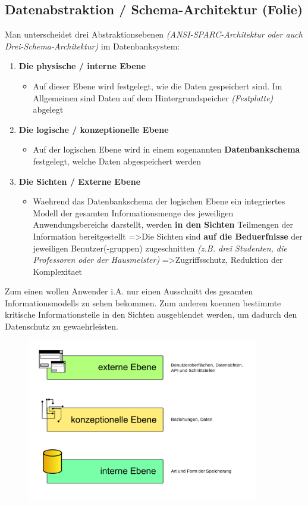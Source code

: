 \documentclass[a4paper,10pt]{article}
\begin{document}
\subsection{Datenabstraktion / Schema-Architektur (Folie)}
Man unterscheidet drei Abstraktionsebenen \emph{(ANSI-SPARC-Architektur oder auch Drei-Schema-Architektur)} im Datenbanksystem:
\begin{enumerate}
\item \textbf{Die physische / interne Ebene}
\begin{itemize}
\item Auf dieser Ebene wird festgelegt, wie die Daten gespeichert sind. Im Allgemeinen sind Daten auf dem Hintergrundspeicher \emph{(Festplatte)} abgelegt
\end{itemize}
\item \textbf{Die logische / konzeptionelle Ebene}
\begin{itemize}
\item Auf der logischen Ebene wird in einem sogenannten \textbf{Datenbankschema} festgelegt, welche Daten abgespeichert werden
\end{itemize}
\item \textbf{Die Sichten / Externe Ebene}
\begin{itemize}
\item Waehrend das Datenbankschema der logischen Ebene ein integriertes Modell der gesamten Informationsmenge des jeweiligen Anwendungsbereichs darstellt, werden \textbf{in den Sichten} Teilmengen der Information bereitgestellt =\textgreater Die Sichten sind \textbf{auf die Beduerfnisse} der jeweiligen Benutzer(-gruppen) zugeschnitten \emph{(z.B. drei Studenten, die Professoren oder der Hausmeister)} =\textgreater Zugriffsschutz, Reduktion der Komplexitaet
\end{itemize}
\end{enumerate}
Zum einen wollen Anwender i.A. nur einen Ausschnitt des gesamten Informationsmodells zu sehen bekommen. Zum anderen koennen bestimmte kritische Informationsteile in den Sichten ausgeblendet werden, um dadurch den Datenschutz zu gewaehrleisten.

\begin{figure}
    \centering
    \includegraphics[width=0.9\textwidth]{images/Drei-Ebenen-Schema-Architektur.png}
\end{figure}	
\end{document}
